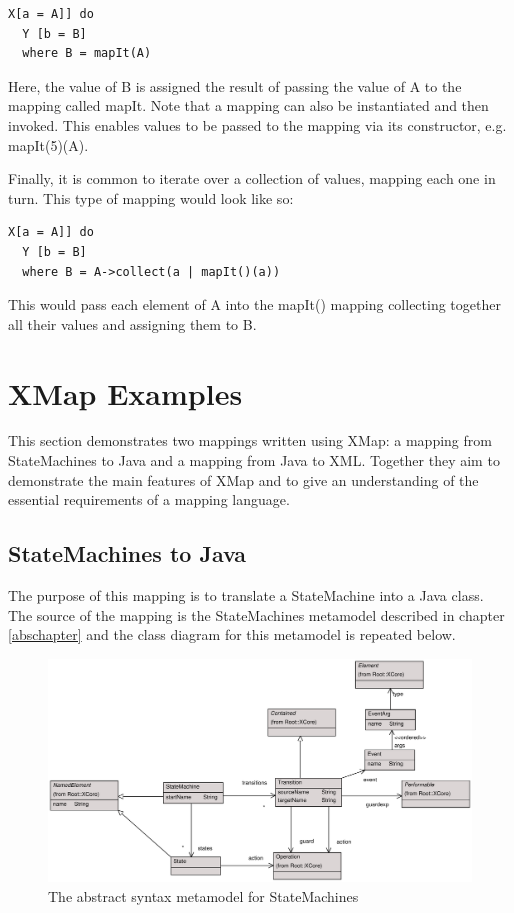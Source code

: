\begin{lstlisting}
X[a = A]] do
  Y [b = B]
  where B = mapIt(A)
\end{lstlisting}Here, the value of B is assigned the result of passing the value
of A to the mapping called mapIt. Note that a mapping can also be
instantiated and then invoked. This enables values to be passed to
the mapping via its constructor, e.g. mapIt(5)(A).

Finally, it is common to iterate over a collection of values,
mapping each one in turn. This type of mapping would look like so:

\begin{lstlisting}
X[a = A]] do
  Y [b = B]
  where B = A->collect(a | mapIt()(a))
\end{lstlisting}\noindent This would pass each element of A into the mapIt()
mapping collecting together all their values and assigning them to
B.

\section{XMap Examples}

This section demonstrates two mappings written using XMap: a
mapping from StateMachines to Java and a mapping from Java to XML.
Together they aim to demonstrate the main features of XMap and to
give an understanding of the essential requirements of a mapping
language.

\subsection{StateMachines to Java}

The purpose of this mapping is to translate a StateMachine into a
Java class. The source of the mapping is the StateMachines
metamodel described in chapter \ref{abschapter} and the class
diagram for this metamodel is repeated below.

\begin{figure}[htb]
\begin{center}
\includegraphics[width=17cm]{Mappings/figures/SMAbs2.pdf}
\caption{The abstract syntax metamodel for StateMachines}
\end{center}
\end{figure}

